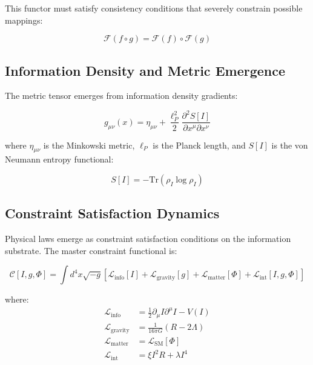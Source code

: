 \documentclass[12pt,a4paper]{article}
\begin{document}
This functor must satisfy consistency conditions that severely constrain possible mappings:

\begin{equation}
\mathcal{F}(f \circ g) = \mathcal{F}(f) \circ \mathcal{F}(g)
\end{equation}

\subsection{Information Density and Metric Emergence}

The metric tensor emerges from information density gradients:

\begin{equation}
g_{\mu\nu}(x) = \eta_{\mu\nu} + \frac{\ell_P^2}{2} \frac{\partial^2 S[I]}{\partial x^\mu \partial x^\nu}
\end{equation}

where $\eta_{\mu\nu}$ is the Minkowski metric, $\ell_P$ is the Planck length, and $S[I]$ is the von Neumann entropy functional:

\begin{equation}
S[I] = -\text{Tr}(\rho_I \log \rho_I)
\end{equation}

\subsection{Constraint Satisfaction Dynamics}

Physical laws emerge as constraint satisfaction conditions on the information substrate. The master constraint functional is:

\begin{equation}
\mathcal{C}[I, g, \Phi] = \int d^4x \sqrt{-g} \left[ \mathcal{L}_{\text{info}}[I] + \mathcal{L}_{\text{gravity}}[g] + \mathcal{L}_{\text{matter}}[\Phi] + \mathcal{L}_{\text{int}}[I,g,\Phi] \right]
\end{equation}

where:
\begin{align}
\mathcal{L}_{\text{info}} &= \frac{1}{2}\partial_\mu I \partial^\mu I - V(I) \\
\mathcal{L}_{\text{gravity}} &= \frac{1}{16\pi G}(R - 2\Lambda) \\
\mathcal{L}_{\text{matter}} &= \mathcal{L}_{\text{SM}}[\Phi] \\
\mathcal{L}_{\text{int}} &= \xi I^2 R + \lambda I^4
\end{align}
\end{document}

